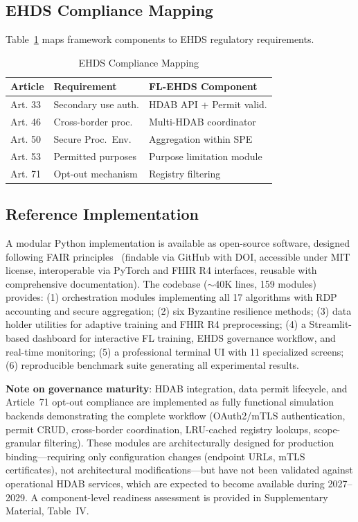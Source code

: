 \documentclass[conference,a4paper]{IEEEtran}
\begin{document}
\subsection{EHDS Compliance Mapping}

Table~\ref{tab:compliance} maps framework components to EHDS regulatory requirements.

\begin{table}[htbp]
\caption{EHDS Compliance Mapping}
\label{tab:compliance}
\centering
\small
\begin{tabular}{lp{2.3cm}p{2.8cm}}
\toprule
\textbf{Article} & \textbf{Requirement} & \textbf{FL-EHDS Component} \\
\midrule
Art. 33 & Secondary use auth. & HDAB API + Permit valid. \\
Art. 46 & Cross-border proc. & Multi-HDAB coordinator \\
Art. 50 & Secure Proc.\ Env. & Aggregation within SPE \\
Art. 53 & Permitted purposes & Purpose limitation module \\
Art. 71 & Opt-out mechanism & Registry filtering \\
\bottomrule
\end{tabular}
\end{table}

\subsection{Reference Implementation}

A modular Python implementation is available as open-source software, designed following FAIR principles~\cite{chaverodiez2026fair} (findable via GitHub with DOI, accessible under MIT license, interoperable via PyTorch and FHIR R4 interfaces, reusable with comprehensive documentation). The codebase ($\sim$40K lines, 159 modules) provides: (1) orchestration modules implementing all 17 algorithms with RDP accounting and secure aggregation; (2) six Byzantine resilience methods; (3) data holder utilities for adaptive training and FHIR R4 preprocessing; (4) a Streamlit-based dashboard for interactive FL training, EHDS governance workflow, and real-time monitoring; (5) a professional terminal UI with 11 specialized screens; (6) reproducible benchmark suite generating all experimental results.

\textbf{Note on governance maturity}: HDAB integration, data permit lifecycle, and Article~71 opt-out compliance are implemented as fully functional simulation backends demonstrating the complete workflow (OAuth2/mTLS authentication, permit CRUD, cross-border coordination, LRU-cached registry lookups, scope-granular filtering). These modules are architecturally designed for production binding---requiring only configuration changes (endpoint URLs, mTLS certificates), not architectural modifications---but have not been validated against operational HDAB services, which are expected to become available during 2027--2029. A component-level readiness assessment is provided in Supplementary Material, Table~IV.
\end{document}
